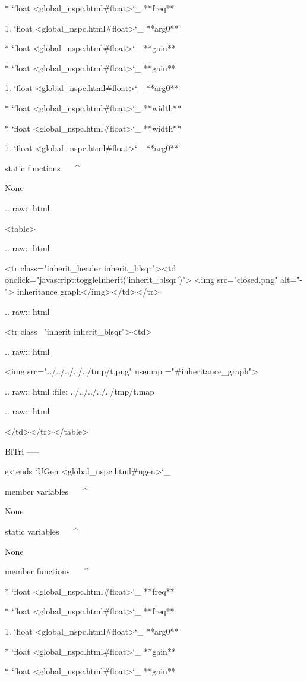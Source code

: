 	* `float <global_nspc.html#float>`_ **freq**

		1. `float <global_nspc.html#float>`_ **arg0**

	* `float <global_nspc.html#float>`_ **gain**

	* `float <global_nspc.html#float>`_ **gain**

		1. `float <global_nspc.html#float>`_ **arg0**

	* `float <global_nspc.html#float>`_ **width**

	* `float <global_nspc.html#float>`_ **width**

		1. `float <global_nspc.html#float>`_ **arg0**

static functions
^^^^^^^^^^^^^^^^


	None


  .. raw:: html

   <table>


  .. raw:: html

   <tr class="inherit_header inherit_blsqr"><td onclick="javascript:toggleInherit('inherit_blsqr')"> <img src="closed.png" alt="-"> inheritance graph</img></td></tr>


  .. raw:: html

   <tr class="inherit inherit_blsqr"><td>


  .. raw:: html

   <img src="../../../../../tmp/t.png" usemap ="#inheritance_graph">


  .. raw:: html
   :file:   ../../../../../tmp/t.map


  .. raw:: html

   </td></tr></table>

BlTri
-----

extends `UGen <global_nspc.html#ugen>`_ 

member variables
^^^^^^^^^^^^^^^^

	None

static variables
^^^^^^^^^^^^^^^^

	None

member functions
^^^^^^^^^^^^^^^^

	* `float <global_nspc.html#float>`_ **freq**

	* `float <global_nspc.html#float>`_ **freq**

		1. `float <global_nspc.html#float>`_ **arg0**

	* `float <global_nspc.html#float>`_ **gain**

	* `float <global_nspc.html#float>`_ **gain**

